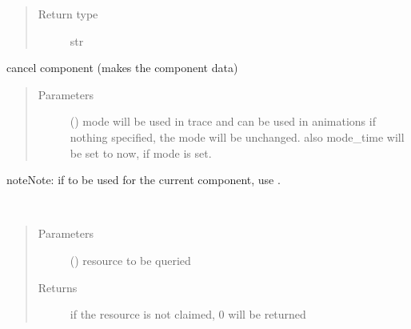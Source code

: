 \documentclass[letterpaper,10pt,english]{sphinxmanual}
\begin{document}
\begin{fulllineitems}
\begin{fulllineitems}
\begin{quote}
\begin{description}
\item[{Return type}] \leavevmode
str

\end{description}\end{quote}

\end{fulllineitems}


\begin{fulllineitems}
\label{\detokenize{Reference:salabim.Component.cancel}}
cancel component (makes the component data)
\begin{quote}\begin{description}
\item[{Parameters}] \leavevmode
{} () \textendash{} mode 
will be used in trace and can be used in animations 
if nothing specified, the mode will be unchanged. 
also mode\_time will be set to now, if mode is set.

\end{description}\end{quote}

\begin{sphinxadmonition}{note}{Note:}
if to be used for the current component, use .
\end{sphinxadmonition}

\end{fulllineitems}


\begin{fulllineitems}
\label{\detokenize{Reference:salabim.Component.claimed_quantity}}~\begin{quote}\begin{description}
\item[{Parameters}] \leavevmode
{} () \textendash{} resource to be queried

\item[{Returns}] \leavevmode
{} \textendash{} if the resource is not claimed, 0 will be returned


\end{description}
\end{quote}
\end{fulllineitems}
\end{fulllineitems}
\end{document}
